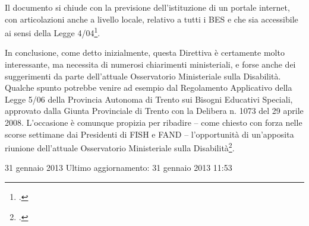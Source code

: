 Il documento si chiude con la previsione dell'istituzione di un portale internet, con articolazioni anche a livello locale, relativo a tutti i BES e che sia accessibile ai sensi della Legge 4/04\footcite{Legge_04_04}.

In conclusione, come detto inizialmente, questa Direttiva è certamente molto interessante, ma necessita di numerosi chiarimenti ministeriali, e forse anche dei suggerimenti da parte dell'attuale Osservatorio Ministeriale sulla Disabilità. Qualche spunto potrebbe venire ad esempio dal Regolamento Applicativo della Legge 5/06 della Provincia Autonoma di Trento sui Bisogni Educativi Speciali, approvato dalla Giunta Provinciale di Trento con la Delibera n. 1073 del 29 aprile 2008.
L'occasione è comunque propizia per ribadire – come chiesto con forza nelle scorse settimane dai Presidenti di FISH e FAND – l'opportunità di un'apposita riunione dell'attuale Osservatorio Ministeriale sulla Disabilità\footcite{nocera8}.

31 gennaio 2013
Ultimo aggiornamento: 31 gennaio 2013 11:53